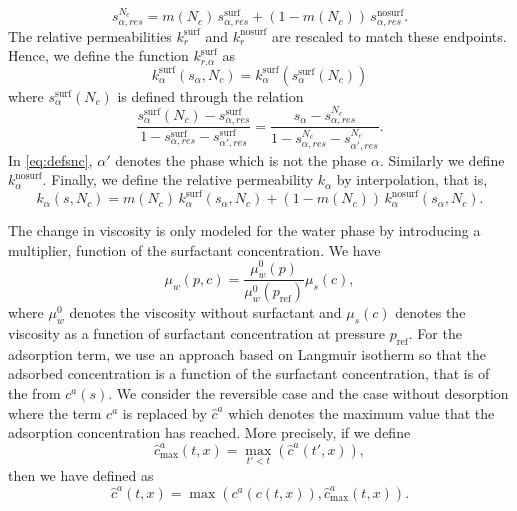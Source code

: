 \documentclass[11pt]{amsart}
\newcommand{\cads}{c^a}
\newcommand{\chatads}{\hat{c}^a}
\newcommand{\pref}{p_\text{ref}}
\newcommand{\surf}{\text{surf}}
\newcommand{\nosurf}{\text{nosurf}}
\begin{document}
\begin{equation}
  \label{eq:srhat}
  s_{\alpha,res}^{N_c} = m(N_c)\,s_{\alpha,res}^{\surf} + (1 - m(N_c))\,s_{\alpha,res}^{\nosurf}.
\end{equation}
The relative permeabilities $k_r^{\surf}$ and $k_r^{\nosurf}$ are rescaled to match these
endpoints. Hence, we define the function $k_{r.\alpha}^{\surf}$ as
\begin{equation}
\label{eq:rescaledkr}
k_{\alpha}^{\surf}(s_\alpha, N_c) = k_\alpha^{\surf}(s_\alpha^{\surf}(N_c))
\end{equation}
where $s_\alpha^{\surf}(N_c)$ is defined through the relation
\begin{equation}
  \label{eq:defsnc}
  \frac{s_\alpha^{\surf}(N_c) - s_{\alpha,res}^{\surf}}{1 - s_{\alpha,res}^{\surf} - s_{\alpha',res}^{\surf}} =   \frac{s_\alpha - s_{\alpha,res}^{N_c}}{1 - s_{\alpha,res}^{N_c} - s_{\alpha',res}^{N_c}}.
\end{equation}
In \eqref{eq:defsnc}, $\alpha'$ denotes the phase which is not the phase $\alpha$. Similarly we
define $k_{\alpha}^{\nosurf}$. Finally, we define the relative permeability $k_{\alpha}$ by
interpolation, that is,
\begin{equation}
  \label{eq:defkralpha}
  k_{\alpha}(s, N_c) = m(N_c)\,k_{\alpha}^{\surf}(s_\alpha, N_c) + (1 - m(N_c))\,k_{\alpha}^{\nosurf}(s_\alpha, N_c).
\end{equation}

The change in viscosity is only modeled for the water phase by introducing a multiplier, function of
the surfactant concentration. We have
\begin{equation}
  \label{eq:defmuw}
  \mu_w(p, c) = \frac{\mu_w^0(p)}{\mu_w^0(\pref)}\mu_{s}(c),
\end{equation}
where $\mu_w^0$ denotes the viscosity without surfactant and $\mu_s(c)$ denotes the viscosity as a
function of surfactant concentration at pressure $\pref$. For the adsorption term, we use an
approach based on Langmuir isotherm so that the adsorbed concentration is a function of the
surfactant concentration, that is of the from $\cads(s)$. We consider the reversible case and the
case without desorption where the term $\cads$ is replaced by $\hat\cads$ which denotes the
maximum value that the adsorption concentration has reached. More precisely, if we define
\begin{equation}
  \label{eq:chatadsmax}
  \chatads_{\max}(t,x) = \max_{t'<t}(\chatads(t',x)),
\end{equation}
then we have
defined as
\begin{equation}
  \label{eq:defchatads}
  \chatads(t, x) = \max(\cads(c(t,x)), \chatads_{\max}(t,x)).
\end{equation}
\end{document}
